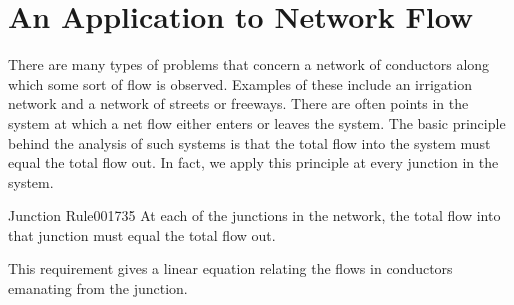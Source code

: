 \section{An Application to Network Flow}
\label{sec:1_4}

There are many types of problems that concern a network of conductors along which some sort of flow is observed. Examples of these include an irrigation network and a network of streets or freeways. There are often points in the system at which a net flow either enters or leaves the system. The basic principle behind the analysis of such systems is that the total flow into the system must equal the total flow out. In fact, we apply this principle at every junction in the system.

\begin{theorem*}{Junction Rule}{001735}
At each of the junctions in the network, the total flow into that junction must equal the total flow out.
\end{theorem*}

\noindent This requirement gives a linear equation relating the flows in conductors emanating from the junction.


